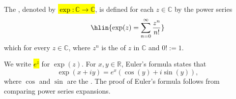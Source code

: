 \begin{definition} \label{definition:complex_exponential_function}
    The , denoted by \hl{$\exp : \mathbb{C} \to \mathbb{C}$}, is defined for each $z \in \mathbb{C}$ by the power series
    $$\hlin{\exp(z) = \sum_{n=0}^\infty \frac{z^n}{n!}}$$
    which  for every $z \in \mathbb{C}$, where $z^n$ is the  of $z$ in $\mathbb{C}$ and $0! := 1$.

    We write \hl{$e^z$} for $\exp(z)$. For $x, y \in \mathbb{R}$, Euler's formula states that
    $$\exp(x + iy) = e^x (\cos(y) + i \sin(y)),$$
    where $\cos$ and $\sin$ are the . The proof of Euler's formula follows from comparing power series expansions.
\end{definition}
